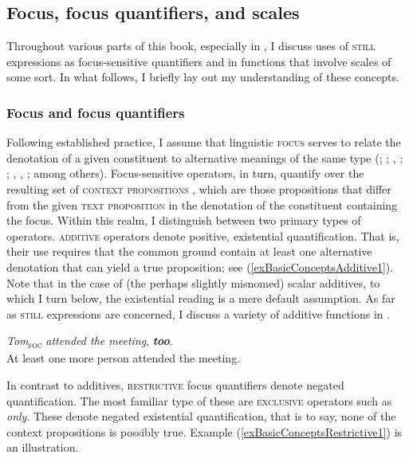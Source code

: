 \subsection{Focus, focus quantifiers, and scales}
\label{sectionQuantificationScales}
Throughout various parts of this book, especially in , I discuss uses of \textsc{still} expressions as focus-sensitive quantifiers and in functions that involve scales of some sort. In what follows, I briefly lay out my understanding of these concepts.

\subsubsection{Focus and focus quantifiers}Following established practice, I assume that linguistic \textsc{focus} serves to relate the denotation of a given constituent to alternative meanings of the same type (\cite{Gast2012}; \cite{GastvanderAuwera2011}; \cite[ch. 1]{Hole2004}, \citeyear{Hole2006}; \cite[ch. 3]{Koenig1991}; \cite[ch. 1]{Rooth1985}, \citeyear{Rooth1992}, \citeyear{Rooth1996}; among others). Focus-sensitive operators, in turn, quantify over the resulting set of \textsc{context propositions} \parencite{Kay1990}, which are those propositions that differ from the given \textsc{text proposition} in the denotation of the constituent containing the focus. Within this realm, I distinguish between two primary types of operators. \textsc{additive} operators denote positive, existential quantification. That is, their use requires that the common ground contain at least one alternative denotation that can yield a true proposition; see (\ref{exBasicConceptsAdditive1}). Note that in the case of (the perhaps slightly misnomed) scalar additives, to which I turn below, the existential reading is a mere default assumption. As far as \textsc{still} expressions are concerned, I discuss a variety of additive functions in .

\begin{exe}
	\ex\label{exBasicConceptsAdditive1}
	 \textit{Tom}\textsubscript{\textsc{foc}} \textit{attended the meeting}, \textbf{\textit{too}}.\\
	 \rightarrow { } At least one more person attended the meeting.
\end{exe} 

In contrast to additives, \textsc{restrictive} focus quantifiers denote negated quantification. The most familiar type of these are \textsc{exclusive} operators such as  \textit{only}. These denote negated existential quantification, that is to say,  none of the context propositions is possibly true. Example (\ref{exBasicConceptsRestrictive1}) is an illustration.

